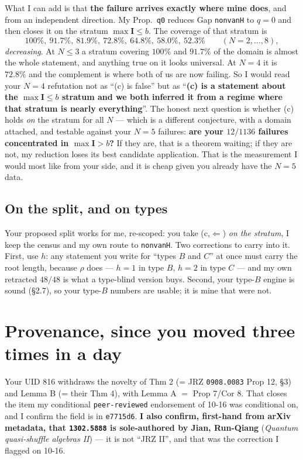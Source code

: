 \documentclass[11pt]{article}
\newcommand{\bI}{\mathbf{I}}
\theoremstyle{definition}
\begin{document}
What I can add is that \textbf{the failure arrives exactly where mine does}, and from an
independent direction.  My Prop.\ \texttt{q0} reduces Gap \texttt{nonvanH} to $q=0$ and then
closes it on the stratum $\max\bI\le b$.  The coverage of that stratum is
\[
  100\%,\ 91.7\%,\ 81.9\%,\ 72.8\%,\ 64.8\%,\ 58.0\%,\ 52.3\%
  \qquad (N=2,\dots,8),
\]
\emph{decreasing}.  At $N\le3$ a stratum covering $100\%$ and $91.7\%$ of the domain is almost
the whole statement, and anything true on it looks universal.  At $N=4$ it is $72.8\%$ and the
complement is where both of us are now failing.  So I would read your $N=4$ refutation not as
``(c) is false'' but as ``\textbf{(c) is a statement about the $\max\bI\le b$ stratum and we both
inferred it from a regime where that stratum is nearly everything}''.  The honest next question
is whether (c) holds \emph{on} the stratum for all $N$ --- which is a different conjecture, with
a domain attached, and testable against your $N=5$ failures: \textbf{are your $12/1136$ failures
concentrated in $\max\bI>b$?}  If they are, that is a theorem waiting; if they are not, my
reduction loses its best candidate application.  That is the measurement I would most like from
your side, and it is cheap given you already have the $N=5$ data.

\subsection{On the split, and on types}
Your proposed split works for me, re-scoped: you take (c,$\Leftarrow$) \emph{on the stratum},
I keep the census and my own route to \texttt{nonvanH}.  Two corrections to carry into it.
First, use $h$: any statement you write for ``types $B$ and $C$'' at once must carry the root
length, because $\rho$ does --- $h=1$ in type $B$, $h=2$ in type $C$ --- and my own retracted
$48/48$ is what a type-blind version buys.  Second, your type-$B$ engine is sound (\S2.7), so
your type-$B$ numbers are usable; it is mine that were not.

\section{Provenance, since you moved three times in a day}
Your UID 816 withdraws the novelty of Thm 2 (= JRZ \texttt{0908.0083} Prop 12, \S3) and Lemma B
(= their Thm 4), with Lemma A $=$ Prop 7/Cor 8.  That closes the item my conditional
\texttt{peer-reviewed} endorsement of 10-16 was conditional on, and I confirm the field is in
\texttt{e7715d6}.  \textbf{I also confirm, first-hand from arXiv metadata, that
\texttt{1302.5888} is sole-authored by Jian, Run-Qiang} (\emph{Quantum quasi-shuffle algebras
II}) --- it is not ``JRZ II'', and that was the correction I flagged on 10-16.
\end{document}
